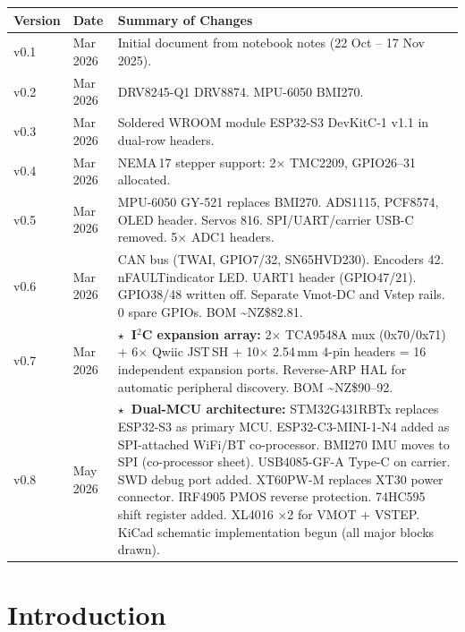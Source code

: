\documentclass[11pt,a4paper]{article}
\begin{document}
\begin{longtable}{p{1.3cm} p{2cm} p{11cm}}
  \toprule
  \rowcolor{headergray}\color{white}\textbf{Version} &
  \color{white}\textbf{Date} &
  \color{white}\textbf{Summary of Changes} \\
  \midrule\endhead
  v0.1 & Mar 2026 & Initial document from notebook notes (22 Oct -- 17 Nov 2025). \\
  v0.2 & Mar 2026 & DRV8245-Q1 \textrightarrow{} DRV8874. MPU-6050 \textrightarrow{} BMI270. \\
  v0.3 & Mar 2026 & Soldered WROOM module \textrightarrow{} ESP32-S3 DevKitC-1 v1.1 in dual-row headers. \\
  v0.4 & Mar 2026 & NEMA\,17 stepper support: 2$\times$ TMC2209, GPIO26--31 allocated. \\
  v0.5 & Mar 2026 & MPU-6050 GY-521 replaces BMI270. ADS1115, PCF8574, OLED header. Servos 8\textrightarrow{}16. SPI/UART/carrier USB-C removed. 5$\times$ ADC1 headers. \\
  v0.6 & Mar 2026 & CAN bus (TWAI, GPIO7/32, SN65HVD230). Encoders 4\textrightarrow{}2. nFAULT\textrightarrow{}indicator LED. UART1 header (GPIO47/21). GPIO38/48 written off. Separate Vmot-DC and Vstep rails. 0 spare GPIOs. BOM \textasciitilde{}NZ\$82.81. \\
  v0.7 & Mar 2026 & \textbf{$\star$\ I$^2$C expansion array:} 2$\times$ TCA9548A mux (0x70/0x71) + 6$\times$ Qwiic JST\,SH + 10$\times$ 2.54\,mm 4-pin headers = 16 independent expansion ports. Reverse-ARP HAL for automatic peripheral discovery. BOM \textasciitilde{}NZ\$90--92. \\
  \rowcolor{newrow}
  v0.8 & May 2026 & \textbf{$\star$\ Dual-MCU architecture:} STM32G431RBTx replaces ESP32-S3 as primary MCU. ESP32-C3-MINI-1-N4 added as SPI-attached WiFi/BT co-processor. BMI270 IMU moves to SPI (co-processor sheet). USB4085-GF-A Type-C on carrier. SWD debug port added. XT60PW-M replaces XT30 power connector. IRF4905 PMOS reverse protection. 74HC595 shift register added. XL4016 $\times$2 for VMOT + VSTEP. KiCad schematic implementation begun (all major blocks drawn). \\
  \bottomrule
\end{longtable}

\section{Introduction}
\end{document}
